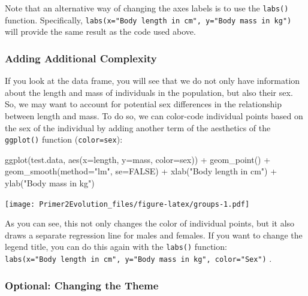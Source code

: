 \documentclass[
]{book}
\newenvironment{Shaded}{\begin{snugshade}}{\end{snugshade}}
\newcommand{\AttributeTok}[1]{\textcolor[rgb]{0.77,0.63,0.00}{#1}}
\newcommand{\ConstantTok}[1]{\textcolor[rgb]{0.00,0.00,0.00}{#1}}
\newcommand{\FunctionTok}[1]{\textcolor[rgb]{0.00,0.00,0.00}{#1}}
\newcommand{\NormalTok}[1]{#1}
\newcommand{\SpecialCharTok}[1]{\textcolor[rgb]{0.00,0.00,0.00}{#1}}
\newcommand{\StringTok}[1]{\textcolor[rgb]{0.31,0.60,0.02}{#1}}
\begin{document}
Note that an alternative way of changing the axes labels is to use the \texttt{labs()} function. Specifically, \texttt{labs(x="Body\ length\ in\ cm",\ y="Body\ mass\ in\ kg")} will provide the same result as the code used above.

\hypertarget{adding-additional-complexity}{%
\subsubsection*{Adding Additional Complexity}\label{adding-additional-complexity}}

If you look at the data frame, you will see that we do not only have information about the length and mass of individuals in the population, but also their sex. So, we may want to account for potential sex differences in the relationship between length and mass. To do so, we can color-code individual points based on the sex of the individual by adding another term of the aesthetics of the \texttt{ggplot()} function (\texttt{color=sex}):

\begin{Shaded}
\begin{Highlighting}[]
\FunctionTok{ggplot}\NormalTok{(test.data, }\FunctionTok{aes}\NormalTok{(}\AttributeTok{x=}\NormalTok{length, }\AttributeTok{y=}\NormalTok{mass, }\AttributeTok{color=}\NormalTok{sex)) }\SpecialCharTok{+}
  \FunctionTok{geom\_point}\NormalTok{() }\SpecialCharTok{+}
  \FunctionTok{geom\_smooth}\NormalTok{(}\AttributeTok{method=}\StringTok{"lm"}\NormalTok{, }\AttributeTok{se=}\ConstantTok{FALSE}\NormalTok{) }\SpecialCharTok{+}
  \FunctionTok{xlab}\NormalTok{(}\StringTok{"Body length in cm"}\NormalTok{) }\SpecialCharTok{+}
  \FunctionTok{ylab}\NormalTok{(}\StringTok{"Body mass in kg"}\NormalTok{)}
\end{Highlighting}
\end{Shaded}

\texttt{[image: Primer2Evolution\_files/figure-latex/groups-1.pdf]}

As you can see, this not only changes the color of individual points, but it also draws a separate regression line for males and females. If you want to change the legend title, you can do this again with the \texttt{labs()} function: \texttt{labs(x="Body\ length\ in\ cm",\ y="Body\ mass\ in\ kg",\ color="Sex")} .

\hypertarget{optional-changing-the-theme}{%
\subsubsection*{Optional: Changing the Theme}\label{optional-changing-the-theme}}
\end{document}
